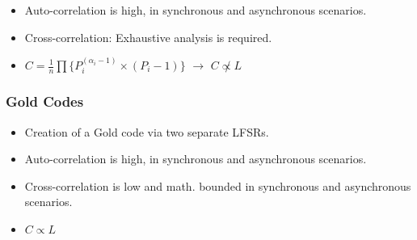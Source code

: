 \documentclass{beamer}
\begin{document}
\begin{frame}
\begin{itemize}
\begin{figure}[t]
{
					}
				\end{figure}

			\item Auto-correlation is high, in synchronous and asynchronous scenarios.

			\item Cross-correlation: Exhaustive analysis is required.

			\item $C = \frac{1}{n} \prod \{ P_{i} ^ {(\alpha_i - 1)} \times (P_i - 1) \}$ $\rightarrow$ $C \not\propto L$


		\end{itemize}
		

	\end{frame}



	\begin{frame}\frametitle{Gold Codes}
		\begin{itemize}
			\item Creation of a Gold code via two separate LFSRs.

			\item Auto-correlation is high, in synchronous and asynchronous scenarios.

			\item Cross-correlation is low and math. bounded in synchronous and asynchronous scenarios.

			\item $C \propto L$


		\end{itemize}
		

	\end{frame}
\end{document}
